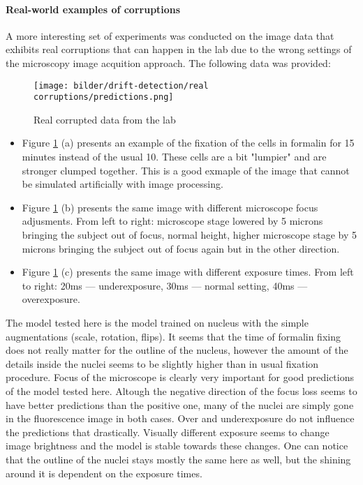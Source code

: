 \paragraph{Real-world examples of corruptions}
A more interesting set of experiments was conducted on the image data that exhibits real corruptions that can happen in the lab due to the wrong settings of the microscopy image acquition approach. The following data was provided: 
\begin{figure}[htb]
	\begin{center}
		\texttt{[image: bilder/drift-detection/real corruptions/predictions.png]}
		\caption{Real corrupted data from the lab}\label{fig:real-corruptions-predictions}
	\end{center}
\end{figure}


\begin{itemize}
    \item Figure \ref{fig:real-corruptions-predictions} (a) presents an example of the fixation of the cells in formalin for 15 minutes instead of the usual 10. These cells are a bit "lumpier" and are stronger clumped together. This is a good exmaple of the image that cannot be simulated artificially with image processing.
    
    \item Figure \ref{fig:real-corruptions-predictions} (b) presents the same image with different microscope focus adjusments. From left to right: microscope stage lowered by 5 microns bringing the subject out of focus, normal height, higher microscope stage by 5 microns bringing the subject out of focus again but in the other direction.
    
    \item Figure \ref{fig:real-corruptions-predictions} (c) presents the same image with different exposure times. From left to right: 20ms --- underexposure, 30ms --- normal setting, 40ms --- overexposure.
\end{itemize}

The model tested here is the model trained on nucleus with the simple augmentations (scale, rotation, flips). It seems that the time of formalin fixing does not really matter for the outline of the nucleus, however the amount of the details inside the nuclei seems to be slightly higher than in usual fixation procedure. Focus of the microscope is clearly very important for good predictions of the model tested here. Altough the negative direction of the focus loss seems to have better predictions than the positive one, many of the nuclei are simply gone in the fluorescence image in both cases. Over and underexposure do not influence the predictions that drastically. Visually different exposure seems to change image brightness and the model is stable towards these changes. One can notice that the outline of the nuclei stays mostly the same here as well, but the shining around it is dependent on the exposure times.